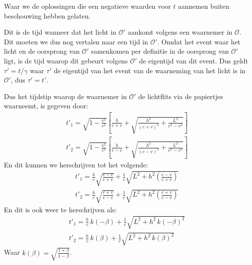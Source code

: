 \documentclass[12pt, dutch, a4paper]{article}
\begin{document}
\begin{enumerate}[(a).]
    Waar we de oplossingen die een negatieve waarden voor $t$ aannemen buiten beschouwing
    hebben gelaten.

    Dit is de tijd wanneer dat het licht in $\mathcal{O}'$ aankomt volgens een waarnemer in $\mathcal{O}$.
    Dit moeten we dus nog vertalen naar een tijd in $\mathcal{O}'$.
    Omdat het event waar het licht en de oorsprong van $\mathcal{O}'$ samenkomen per definitie
    in de oorsprong van $\mathcal{O}'$ ligt, 
    is de tijd waarop dit gebeurt volgens $\mathcal{O}'$ de eigentijd van dit event.
    Dus geldt $\tau' = t / \gamma$ 
    waar $\tau'$ de eigentijd van het event van de waarneming van het licht is in $\mathcal{O}'$, dus
    $\tau' = t'$.


    Dus het tijdstip waarop de waarnemer in $\mathcal{O}'$
    de lichtflits via de papiertjes waarneemt, is gegeven door:
    \begin{equation}
        \begin{split}
            t'_1 = \sqrt{1 - \frac{v^2}{c^2}} \left[\frac{h}{c + v} +
            \sqrt{\frac{h^{2}}{\left(c + v\right)^{2}}+\frac{L^{2}}{c^{2}- v^{2}}}\right]\\
            t'_2 = \sqrt{1 - \frac{v^2}{c^2}} \left[\frac{h}{c-v}+
            \sqrt{\frac{h^{2}}{\left(c-v\right)^{2}}+\frac{L^{2}}{c^{2}-v^{2}}}\right]
        \end{split}
    \end{equation}
    En dit kunnen we herschrijven tot het volgende:
    \begin{equation}
        \begin{split}
            t'_1 = \frac{h}{c}\sqrt{\frac{c-v}{c+v}}+
            \frac{1}{c}\sqrt{L^{2} + h^{2}\left(\frac{c-v}{c+v}\right)}\\
            t'_2 = \frac{h}{c}\sqrt{\frac{c+v}{c-v}}+
            \frac{1}{c}\sqrt{L^{2} + h^{2}\left(\frac{c+v}{c-v}\right)}
        \end{split}
    \end{equation}
    En dit is ook weer te herschrijven als:
    \begin{equation}
        \begin{split}
            t'_1 = \frac{h}{c} \, k(-\beta)+
            \frac{1}{c}\sqrt{L^{2} + h^2\,k(-\beta)^2}\\
            t'_2 = \frac{h}{c} \, k(\beta)+
            \frac{1}{c}\sqrt{L^{2} + h^2\,k(\beta)^2}
        \end{split}
    \end{equation}
    Waar $k(\beta) = \sqrt{\frac{1+\beta}{1-\beta}}$.


\end{enumerate}
\end{document}
